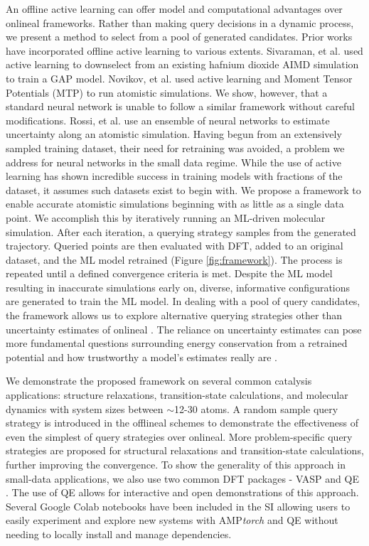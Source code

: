 \documentclass[
 reprint,
 amsmath,
 amssymb,
 aps,
]{revtex4-1}
\begin{document}
An offline active learning can offer model and computational advantages over \gls{onlineal} frameworks. Rather than making query decisions in a dynamic process, we present a method to select from a pool of generated candidates. Prior works have incorporated offline active learning to various extents. Sivaraman, et al. \cite{Sivaraman2020} used active learning to downselect from an existing hafnium dioxide AIMD simulation to train a GAP model. Novikov, et al. \cite{novikov2020mlip} used active learning and Moment Tensor Potentials (MTP) to run atomistic simulations. We show, however, that a standard neural network is unable to follow a similar framework without careful modifications. Rossi, et al. \cite{Rossi2020} use an ensemble of neural networks to estimate uncertainty along an atomistic simulation. Having begun from an extensively sampled training dataset, their need for retraining was avoided, a problem we address for neural networks in the small data regime. While the use of active learning has shown incredible success in training models with fractions of the dataset, it assumes such datasets exist to begin with. We propose a framework to enable accurate atomistic simulations beginning with as little as a single data point. We accomplish this by iteratively running an ML-driven molecular simulation. After each iteration, a querying strategy samples from the generated trajectory. Queried points are then evaluated with DFT, added to an original dataset, and the ML model retrained (Figure \ref{fig:framework}). The process is repeated until a defined convergence criteria is met. Despite the ML model resulting in inaccurate simulations early on, diverse, informative configurations are generated to train the ML model. In dealing with a pool of query candidates, the framework allows us to explore alternative querying strategies other than uncertainty estimates of \gls{onlineal} \cite{Settles2010}. The reliance on uncertainty estimates can pose more fundamental questions surrounding energy conservation from a retrained potential \cite{novikov2020mlip} and how trustworthy a model's estimates really are \cite{Tran2020}. 

We demonstrate the proposed framework on several common catalysis applications: structure relaxations, transition-state calculations, and molecular dynamics with system sizes between $\sim$12-30 atoms. A random sample query strategy is introduced in the \gls{offlineal} schemes to demonstrate the effectiveness of even the simplest of query strategies over \gls{onlineal}. More problem-specific query strategies are proposed for structural relaxations and transition-state calculations, further improving the convergence. To show the generality of this approach in small-data applications, we also use two common \gls{DFT} packages - \gls{VASP} and \gls{QE} \cite{Kresse1993,Kresse1996, Giannozzi2009}. The use of \gls{QE} allows for interactive and open demonstrations of this approach.  Several Google Colab notebooks have been included in the \gls{SI} allowing users to easily experiment and explore new systems with AMP\textit{torch} and \gls{QE} without needing to locally install and manage dependencies.
\end{document}
